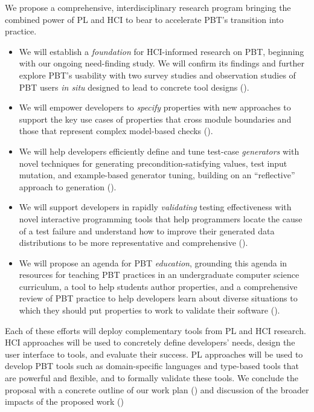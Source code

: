 We propose a comprehensive, interdisciplinary research program
bringing the combined power of PL and HCI to bear to accelerate PBT's
transition into practice.
\begin{itemize}[noitemsep]
\item We will establish a \emph{foundation} for HCI-informed research on PBT,
beginning with our ongoing need-finding study. We will confirm
its findings and further explore PBT's usability with
two\iflater{}\fi{} survey studies and observation studies
of PBT users {\em in situ} designed to lead to concrete tool designs
().
  \item We will empower developers to \emph{specify} properties with new approaches
to support the key use cases of properties that cross module boundaries and
those that represent complex model-based checks ().
  \item We will help developers efficiently define and tune test-case
\emph{generators} with novel techniques for generating precondition-satisfying
values, test input mutation, and example-based generator tuning, building
  on an ``reflective'' approach to generation ().
  \item We will support developers in rapidly \emph{validating} testing
  effectiveness with novel interactive programming tools that help programmers
locate the cause of a test failure and understand how to improve their generated
data distributions to be more representative and comprehensive
().
  \item We will propose an agenda for PBT \emph{education}, grounding this
  agenda in resources for teaching PBT practices in an undergraduate
  computer science curriculum, a tool to help students author
  properties, and a comprehensive review of PBT practice
  to help developers learn about diverse situations to which they should
  put properties to work to validate their software
  ().
\end{itemize}

Each of these efforts will deploy complementary tools from PL
and HCI research. HCI approaches will be used to concretely define developers' needs,
design the user interface to tools, and evaluate their success. PL approaches
will be used to develop PBT tools such as domain-specific languages and
type-based tools that are powerful and flexible, and to formally validate these
tools. We conclude the proposal with a concrete outline of our work plan
() and discussion of the broader impacts of the
proposed work ()

